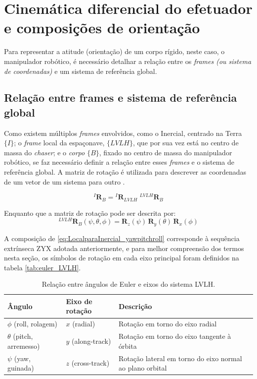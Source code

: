 \section{Cinemática diferencial do efetuador e composições de orientação}


Para representar a atitude (orientação) de um corpo rígido, neste caso, o manipulador robótico, é necessário detalhar a relação entre os \emph{frames (ou sistema de coordenadas)} e um sistema de referência global.

\subsection{Relação entre frames e sistema de referência global}
Como existem múltiplos
\emph{frames} envolvidos, como o Inercial, centrado na Terra $\{I\}$;
o \emph{frame} local da espaçonave, $\{LVLH\}$, que por sua vez está no centro de massa do \emph{chaser};
e o \emph{corpo $\{B\}$}, fixado no centro de massa do manipulador robótico,
se faz necessário definir a relação entre esses \emph{frames} e o sistema de referência global.
A matriz de rotação é utilizada para descrever as coordenadas de um vetor de um sistema para outro \cite{craig2005}.

\begin{equation}
\label{eq:LocalparaInercial}
{}^{I}\mathbf{R}_{B} = {}^{I}\mathbf{R}_{LVLH}\;{}^{LVLH}\mathbf{R}_{B}
\end{equation}

Enquanto que a matriz de rotação pode ser descrita por:
\begin{equation}
\label{eq:LocalparaInercial_yawpitchroll}
{}^{LVLH}\mathbf{R}_{B} (\psi,\theta,\phi) = \mathbf{R}_z(\psi)\,\mathbf{R}_y(\theta)\,\mathbf{R}_x(\phi)
\end{equation}

A composição de \eqref{eq:LocalparaInercial_yawpitchroll} corresponde à sequência extrínseca ZYX adotada anteriormente, e para melhor compreensão dos termos nesta seção, os símbolos de rotação em cada eixo principal foram definidos na tabela \eqref{tab:euler_LVLH}.

\begin{table}[ht]
    \centering
    \footnotesize
    \caption{Relação entre ângulos de Euler e eixos do sistema LVLH.}
    \label{tab:euler_LVLH}
    \begin{tabular}{lll}
        \hline
        \textbf{Ângulo} & \textbf{Eixo de rotação} & \textbf{Descrição} \\
        \hline
        $\phi$ (roll, rolagem)
        & $x$ (radial)
        & Rotação em torno do eixo radial \\

        $\theta$ (pitch, arremesso)
        & $y$ (along-track)
        & Rotação em torno do eixo tangente à órbita \\

        $\psi$ (yaw, guinada)
        & $z$ (cross-track)
        & Rotação lateral em torno do eixo normal ao plano orbital \\

        \hline
    \end{tabular}
\end{table}

